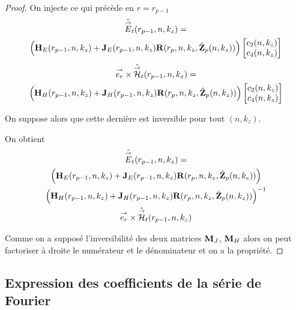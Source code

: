 \begin{proof}
      On injecte ce qui précède en \(r = r_{p-1}\)
      \begin{multline*}
        \hat{{\overset{\rightarrow}{E}}}_t(r_{p-1},n,k_z) = 
        \\
        \left(\mathbf{H}_{E}(r_{p-1},n,k_z) + \mathbf{J}_{E}(r_{p-1},n,k_z)\mathbf{R}(r_{p},n,k_z,\hat{\mathbf{Z}}_p(n,k_z))\right)
        \begin{bmatrix}
          c_2(n,k_z) \\
          c_4(n,k_z)
        \end{bmatrix}
      \end{multline*}        
      \begin{multline*}
        {\overset{\rightarrow}{e_r}}\times\hat{{\overset{\rightarrow}{\mathcal{H}}}}_t(r_{p-1},n,k_z) =
        \\
        \left(\mathbf{H}_{H}(r_{p-1},n,k_z) + \mathbf{J}_{H}(r_{p-1},n,k_z)\mathbf{R}(r_{p},n,k_z,\hat{\mathbf{Z}}_p(n,k_z))\right)
        \begin{bmatrix}
          c_2(n,k_z) \\
          c_4(n,k_z)
        \end{bmatrix}
      \end{multline*}

      On suppose alors que cette dernière est inversible pour tout \((n,k_z)\).

      On obtient
      \begin{multline*}
        \hat{{\overset{\rightarrow}{E}}}_t(r_{p-1},n,k_z) =
        \\
        \left(\mathbf{H}_{E}(r_{p-1},n,k_z) + \mathbf{J}_{E}(r_{p-1},n,k_z)\mathbf{R}(r_{p},n,k_z,\hat{\mathbf{Z}}_p(n,k_z))\right) \\
        \left(\mathbf{H}_{H}(r_{p-1},n,k_z) + \mathbf{J}_{H}(r_{p-1},n,k_z)\mathbf{R}(r_{p},n,k_z,\hat{\mathbf{Z}}_p(n,k_z))\right)^{-1}
        \\
        {\overset{\rightarrow}{e_r}}\times\hat{{\overset{\rightarrow}{\mathcal{H}}}}_t(r_{p-1},n,k_z)
      \end{multline*}

      Comme on a supposé l'inversibilité des deux matrices \(\mathbf{M}_J\), \(\mathbf{M}_H\) alors on peut factoriser à droite le numérateur et le dénominateur et on a la propriété.

    \end{proof}


  \subsection{Expression des coefficients de la série de Fourier}


